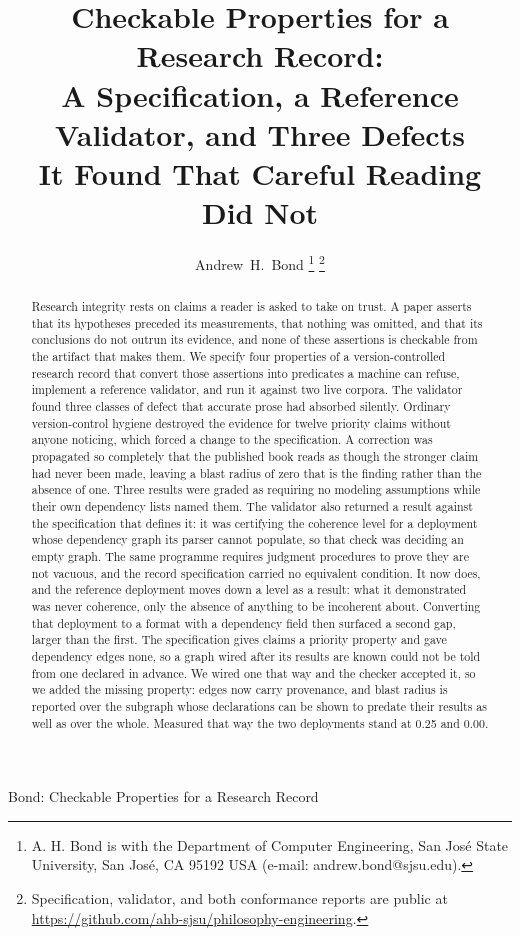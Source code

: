 \documentclass[journal]{IEEEtran}
\begin{document}
\title{Checkable Properties for a Research Record:\\
A Specification, a Reference Validator, and Three Defects\\
It Found That Careful Reading Did Not}

\author{Andrew~H.~Bond%
\thanks{A. H. Bond is with the Department of Computer Engineering, San Jos\'e
State University, San Jos\'e, CA 95192 USA (e-mail: andrew.bond@sjsu.edu).}%
\thanks{Specification, validator, and both conformance reports are public at
\url{https://github.com/ahb-sjsu/philosophy-engineering}.}}

%
{Bond: Checkable Properties for a Research Record}

\maketitle

\begin{abstract}
Research integrity rests on claims a reader is asked to take on trust. A paper
asserts that its hypotheses preceded its measurements, that nothing was omitted,
and that its conclusions do not outrun its evidence, and none of these assertions
is checkable from the artifact that makes them. We specify four properties of a
version-controlled research record that convert those assertions into predicates
a machine can refuse, implement a reference validator, and run it against two
live corpora. The validator found three classes of defect that accurate prose had
absorbed silently. Ordinary version-control hygiene destroyed the evidence for
twelve priority claims without anyone noticing, which forced a change to the
specification. A correction was propagated so completely that the published book
reads as though the stronger claim had never been made, leaving a blast radius of
zero that is the finding rather than the absence of one. Three results were
graded as requiring no modeling assumptions while their own dependency lists
named them. The validator also returned a result against the specification that
defines it: it was certifying the coherence level for a deployment whose
dependency graph its parser cannot populate, so that check was deciding an empty
graph. The same programme requires judgment procedures to prove they are not
vacuous, and the record specification carried no equivalent condition. It now
does, and the reference deployment moves down a level as a result: what it
demonstrated was never coherence, only the absence of anything to be incoherent
about. Converting that deployment to a format with a dependency field then
surfaced a second gap, larger than the first. The specification gives claims a
priority property and gave dependency edges none, so a graph wired after its
results are known could not be told from one declared in advance. We wired one
that way and the checker accepted it, so we added the missing property: edges
now carry provenance, and blast radius is reported over the subgraph whose
declarations can be shown to predate their results as well as over the whole.
Measured that way the two deployments stand at 0.25 and 0.00.
\end{abstract}
\end{document}
